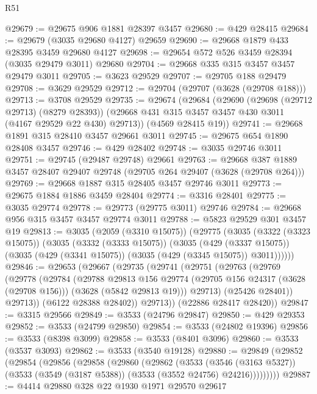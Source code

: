 \begin{lexlean}{R51}
\begin{coremodule}
@29679 := @29675 @906 @1881 @28397 @3457
@29680 := @429 @28415
@29684 := @29679 (@3035 @29680 @4127) @29659
@29690 := @29668 @1879 @433 @28395 @3459 @29680 @4127
@29698 := @29654 @572 @526 @3459 @28394 (@3035 @29479 @3011) @29680
@29704 := @29668 @335 @315 @3457 @3457 @29479 @3011
@29705 := @3623 @29529
@29707 := @29705 @188 @29479
@29708 := @3629 @29529
@29712 := @29704 (@29707 (@3628 (@29708 @188)))
@29713 := @3708 @29529
@29735 := @29674
    (@29684
      (@29690
        (@29698 (@29712 @29713) (@8279 @28393))
        (@29668 @431 @315 @3457 @3457 @430 @3011 (@4167 @29529 @22 @430) @29713))
      (@4569 @28415 @19))
@29741 := @29668 @1891 @315 @28410 @3457 @29661 @3011
@29745 := @29675 @654 @1890 @28408 @3457
@29746 := @429 @28402
@29748 := @3035 @29746 @3011
@29751 := @29745 (@29487 @29748) @29661
@29763 := @29668 @387 @1889 @3457 @28407 @29407 @29748 (@29705 @264 @29407 (@3628 (@29708 @264)))
@29769 := @29668 @1887 @315 @28405 @3457 @29746 @3011
@29773 := @29675 @1884 @1886 @3459 @28404
@29774 := @3316 @28401
@29775 := @3035 @29774
@29778 := @29773 (@29775 @3011) @29746
@29784 := @29668 @956 @315 @3457 @3457 @29774 @3011
@29788 := @5823 @29529 @301 @3457 @19
@29813 := @3035
    (@2059 (@3310 @15075))
    (@29775
      (@3035
        (@3322 (@3323 @15075))
        (@3035
          (@3332 (@3333 @15075))
          (@3035
            (@429 (@3337 @15075))
            (@3035 (@429 (@3341 @15075)) (@3035 (@429 (@3345 @15075)) @3011))))))
@29846 := @29653
    (@29667
      (@29735
        (@29741
          (@29751
            (@29763
              (@29769
                (@29778
                  (@29784
                    (@29788
                      @29813
                      @156
                      @29774
                      (@29705 @156 @24317 (@3628 (@29708 @156)))
                      (@3628 (@5842 @29813 @19)))
                    @29713)
                  (@25426 @28401))
                @29713))
            (@6122 @28388 @28402))
          @29713))
      (@22886 @28417 @28420))
@29847 := @3315 @29566
@29849 := @3533 (@24796 @29847)
@29850 := @429 @29353
@29852 := @3533 (@24799 @29850)
@29854 := @3533 (@24802 @19396)
@29856 := @3533 (@8398 @3099)
@29858 := @3533 (@8401 @3096)
@29860 := @3533 (@3537 @3093)
@29862 := @3533 (@3540 @19128)
@29880 := @29849
    (@29852
      (@29854
        (@29856
          (@29858
            (@29860
              (@29862
                (@3533
                  (@3546 (@3163 @5327))
                  (@3533 (@3549 (@3187 @5388)) (@3533 (@3552 @24756) @24216)))))))))
@29887 := @4414 @29880 @328 @22 @1930 @1971 @29570 @29617

\end{coremodule}
\end{lexlean}
